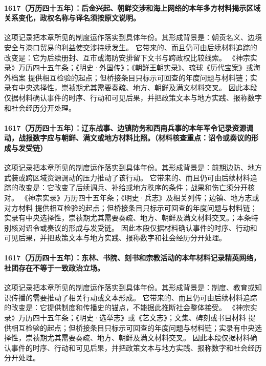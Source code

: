 \paragraph{1617（万历四十五年）：后金兴起、朝鲜交涉和海上网络的本年多方材料揭示区域关系变化，政权名称与译名须按原文说明。} 这项记录把本章所见的制度运作落实到具体年份。其形成背景是：朝贡名义、边境安全与港口贸易的利益使交涉持续发生。 它带来的、而且仍可由后续材料追踪的改变是：它为后续册封、互市或海防安排留下文书与跨政权比较线索。 《神宗实录》万历四十五年条；《明史·外国传》；《朝鲜王朝实录》、琉球《历代宝案》或海外档案 提供相互检验的起点；但桥接条目只标示可回查的年度问题与材料链；实录有中央选择性，崇祯期尤其需要奏疏、地方、朝鲜及满文材料交叉。 因此本段仅据材料确认事件的时序、行动和可见后果，并把政策文本与地方实践、报称数字和社会经历分开处理。

\paragraph{1617（万历四十五年）：辽东战事、边镇防务和西南兵事的本年军令记录资源调动，战报数字应与朝鲜、满文或地方材料比照。（材料核查重点：诏令或奏议的形成与发受链）} 这项记录把本章所见的制度运作落实到具体年份。其形成背景是：前期边防、地方武装或跨区域资源调动的压力推动了该行动。 它带来的、而且仍可由后续材料追踪的改变是：它改变了后续调兵、补给或地方秩序的条件；战果和伤亡须分开核对。 《神宗实录》万历四十五年条；《明史·兵志》及相关列传；边镇、地方志或对方材料 提供相互检验的起点；但桥接条目只标示可回查的年度问题与材料链；实录有中央选择性，崇祯期尤其需要奏疏、地方、朝鲜及满文材料交叉。；本条特别核对诏令或奏议的形成与发受链。 因此本段仅据材料确认事件的时序、行动和可见后果，并把政策文本与地方实践、报称数字和社会经历分开处理。

\paragraph{1617（万历四十五年）：东林、书院、刻书和宗教活动的本年材料记录精英网络，社团存在不等于一致政治立场。} 这项记录把本章所见的制度运作落实到具体年份。其形成背景是：制度、教育或知识传播的需要推动了相关行动或文本形成。 它带来的、而且仍可由后续材料追踪的改变是：它提供制度和传播史的锚点，不能据此推断社会整体接受。 《神宗实录》万历四十五年条；《明史·选举志》或《艺文志》；文集、碑刻或书目材料 提供相互检验的起点；但桥接条目只标示可回查的年度问题与材料链；实录有中央选择性，崇祯期尤其需要奏疏、地方、朝鲜及满文材料交叉。 因此本段仅据材料确认事件的时序、行动和可见后果，并把政策文本与地方实践、报称数字和社会经历分开处理。

